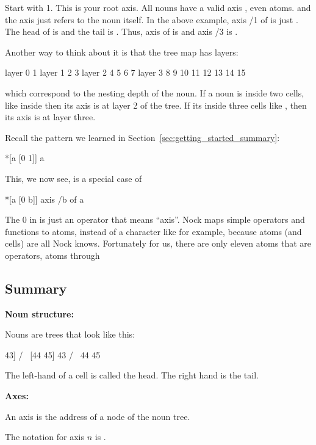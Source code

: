 Start with 1. This is your root axis. All nouns have a valid axis , even
atoms. and the axis  just refers to the noun itself. In the above example,
axis /1 of \kode{[[44 45] 43]} is just \kode{[[44 45] 43]}. The head of \kode{[[44 45] 43]} is
\kode{[44 45]} and the tail is . Thus, axis  of \kode{[[44 45] 43]} is \kode{[44 45]}
and axis /3 is .

Another way to think about it is that the tree map has layers:
\begin{code}
layer 0             1
layer 1        2          3
layer 2     4    5     6     7
layer 3    8 9 10 11 12 13 14 15
\end{code}
which correspond to the nesting depth of the noun. If a noun is inside two
cells, like  inside \kode{[[[48 49] 45] [46 47]]} then its axis is at layer 2 of
the tree. If its inside three cells like , then its axis is at layer
three.

Recall the pattern we learned in Section~\ref{sec:getting_started_summary}:
\begin{code}
*[a [0 1]]                  a
\end{code}
This, we now see, is a special case of
\begin{code}
*[a [0 b]]              axis /b of a
\end{code}
The 0 in \kode{*[a [0 b]]} is just an operator that means ``axis''. Nock maps simple
operators and functions to atoms, instead of a character like \kode{/} for example,
because atoms (and cells) are all Nock knows. Fortunately for us,
there are only eleven atoms that are operators, atoms  through 

\subsection{Summary}

\textbf{Noun structure:}

Nouns are trees that look like this:
\begin{code}
 [[44 45] 43]
    /      \
[44 45]    43
 /   \
44   45
\end{code}
The left-hand of a cell is called the head. The right hand is the tail.

\textbf{Axes:}

An axis is the address of a node of the noun tree.

The notation for axis \(n\) is .

